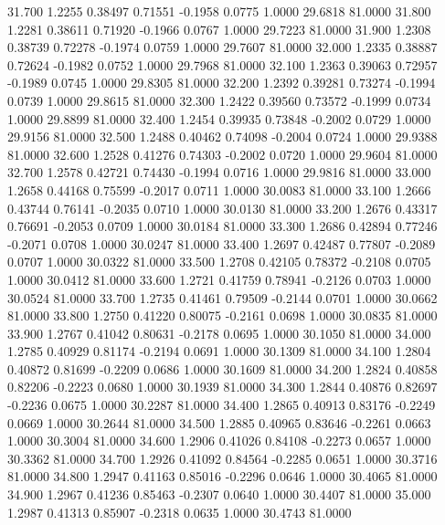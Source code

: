   31.700   1.2255   0.38497   0.71551  -0.1958   0.0775   1.0000  29.6818  81.0000
  31.800   1.2281   0.38611   0.71920  -0.1966   0.0767   1.0000  29.7223  81.0000
  31.900   1.2308   0.38739   0.72278  -0.1974   0.0759   1.0000  29.7607  81.0000
  32.000   1.2335   0.38887   0.72624  -0.1982   0.0752   1.0000  29.7968  81.0000
  32.100   1.2363   0.39063   0.72957  -0.1989   0.0745   1.0000  29.8305  81.0000
  32.200   1.2392   0.39281   0.73274  -0.1994   0.0739   1.0000  29.8615  81.0000
  32.300   1.2422   0.39560   0.73572  -0.1999   0.0734   1.0000  29.8899  81.0000
  32.400   1.2454   0.39935   0.73848  -0.2002   0.0729   1.0000  29.9156  81.0000
  32.500   1.2488   0.40462   0.74098  -0.2004   0.0724   1.0000  29.9388  81.0000
  32.600   1.2528   0.41276   0.74303  -0.2002   0.0720   1.0000  29.9604  81.0000
  32.700   1.2578   0.42721   0.74430  -0.1994   0.0716   1.0000  29.9816  81.0000
  33.000   1.2658   0.44168   0.75599  -0.2017   0.0711   1.0000  30.0083  81.0000
  33.100   1.2666   0.43744   0.76141  -0.2035   0.0710   1.0000  30.0130  81.0000
  33.200   1.2676   0.43317   0.76691  -0.2053   0.0709   1.0000  30.0184  81.0000
  33.300   1.2686   0.42894   0.77246  -0.2071   0.0708   1.0000  30.0247  81.0000
  33.400   1.2697   0.42487   0.77807  -0.2089   0.0707   1.0000  30.0322  81.0000
  33.500   1.2708   0.42105   0.78372  -0.2108   0.0705   1.0000  30.0412  81.0000
  33.600   1.2721   0.41759   0.78941  -0.2126   0.0703   1.0000  30.0524  81.0000
  33.700   1.2735   0.41461   0.79509  -0.2144   0.0701   1.0000  30.0662  81.0000
  33.800   1.2750   0.41220   0.80075  -0.2161   0.0698   1.0000  30.0835  81.0000
  33.900   1.2767   0.41042   0.80631  -0.2178   0.0695   1.0000  30.1050  81.0000
  34.000   1.2785   0.40929   0.81174  -0.2194   0.0691   1.0000  30.1309  81.0000
  34.100   1.2804   0.40872   0.81699  -0.2209   0.0686   1.0000  30.1609  81.0000
  34.200   1.2824   0.40858   0.82206  -0.2223   0.0680   1.0000  30.1939  81.0000
  34.300   1.2844   0.40876   0.82697  -0.2236   0.0675   1.0000  30.2287  81.0000
  34.400   1.2865   0.40913   0.83176  -0.2249   0.0669   1.0000  30.2644  81.0000
  34.500   1.2885   0.40965   0.83646  -0.2261   0.0663   1.0000  30.3004  81.0000
  34.600   1.2906   0.41026   0.84108  -0.2273   0.0657   1.0000  30.3362  81.0000
  34.700   1.2926   0.41092   0.84564  -0.2285   0.0651   1.0000  30.3716  81.0000
  34.800   1.2947   0.41163   0.85016  -0.2296   0.0646   1.0000  30.4065  81.0000
  34.900   1.2967   0.41236   0.85463  -0.2307   0.0640   1.0000  30.4407  81.0000
  35.000   1.2987   0.41313   0.85907  -0.2318   0.0635   1.0000  30.4743  81.0000
